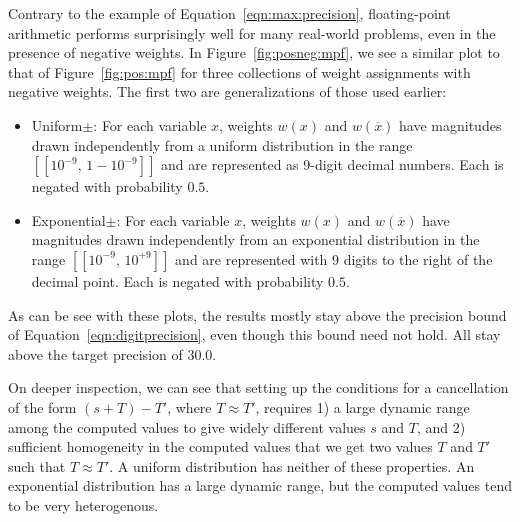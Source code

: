 \documentclass[letterpaper,USenglish,cleveref, autoref, thm-restate]{lipics-v2021}
\newcommand{\obar}[1]{\overline{#1}}
\newcommand{\interval}[1]{[\![#1]\!]}
\begin{document}
Contrary to the example of
Equation~\ref{eqn:max:precision},
floating-point arithmetic performs surprisingly well for
many real-world
problems, even in the presence of negative weights.
In Figure~\ref{fig:posneg:mpf}, we see a similar plot to that of Figure~\ref{fig:pos:mpf} for
three collections of weight assignments with negative weights.  The first two are generalizations of those used earlier:
\begin{itemize}
\item \textsf{Uniform$\pm$}: For each variable $x$, weights $w(x)$ and $w(\obar{x})$ have magnitudes drawn independently
from a uniform distribution in the range  $\interval{10^{-9},\,1-10^{-9}}$ and are represented as 9-digit decimal numbers.  Each is negated with probability $0.5$.
\item \textsf{Exponential$\pm$}: For each variable $x$, weights $w(x)$ and $w(\obar{x})$ have magnitudes
  drawn independently from an exponential distribution in the range $\interval{10^{-9},\,10^{+9}}$ and are represented with 9 digits to the right of the decimal point.  Each is negated with probability $0.5$.
\end{itemize}
As can be see with these plots, the results mostly stay above the precision bound of Equation~\ref{eqn:digitprecision},
even though this bound need not hold.  All stay above the target precision of $30.0$.

On deeper inspection, we can see that setting up the conditions for a
cancellation of the form $(s + T) - T'$, where $T \approx T'$, requires
1) a large dynamic range among the computed values to give widely different values $s$ and $T$, and 2) sufficient
homogeneity in the computed values that we get two values $T$ and
$T'$ such that $T \approx T'$.  A uniform distribution has neither of
these properties.  An exponential distribution has a large dynamic
range, but the computed values tend to be very heterogenous.
\end{document}
